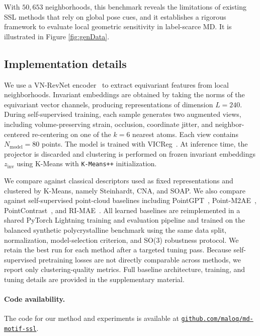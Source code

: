 \documentclass[runningheads]{llncs}
\begin{document}
With $50{,}653$ neighborhoods, this benchmark reveals the limitations of existing SSL methods that rely on global pose cues, and it establishes a rigorous framework to evaluate local geometric sensitivity in label-scarce MD. It is illustrated in Figure \ref{fig:genData}.

\subsection{Implementation details}
\label{sec:impl_details}

We use a VN-RevNet encoder~\cite{Ni2026RevNet} to extract equivariant features from local neighborhoods. Invariant embeddings are obtained by taking the norms of the equivariant vector channels, producing representations of dimension $L=240$.
During self-supervised training, each sample generates two augmented views, including volume-preserving strain, occlusion, coordinate jitter, and neighbor-centered re-centering on one of the $k=6$ nearest atoms. Each view contains $N_{\mathrm{model}}=80$ points. The model is trained with VICReg~\cite{bardes2022vicreg}. At inference time, the projector is discarded and clustering is performed on frozen invariant embeddings $z_{\mathrm{inv}}$ using K-Means with \texttt{K-Means++} initialization.

We compare against classical descriptors used as fixed representations and clustered by K-Means, namely Steinhardt, CNA, and SOAP. We also compare against self-supervised point-cloud baselines including PointGPT~\cite{chenPointGPT}, Point-M2AE~\cite{pointM2AE},  PointContrast~\cite{xie2020pointcontrast}, and RI-MAE~\cite{Su2024RIMAERM}. All learned baselines are reimplemented in a shared PyTorch Lightning training and evaluation pipeline and trained on the balanced synthetic polycrystalline benchmark using the same data split, normalization, model-selection criterion, and SO(3) robustness protocol. We retain the best run for each method after a targeted tuning pass. Because self-supervised pretraining losses are not directly comparable across methods, we report only clustering-quality metrics. Full baseline architecture, training, and tuning details are provided in the supplementary material.

\paragraph{Code availability.}
The code for our method and experiments is available at
\href{https://github.com/maloq/md-motif-ssl}{\texttt{github.com/maloq/md-motif-ssl}}.
\end{document}
